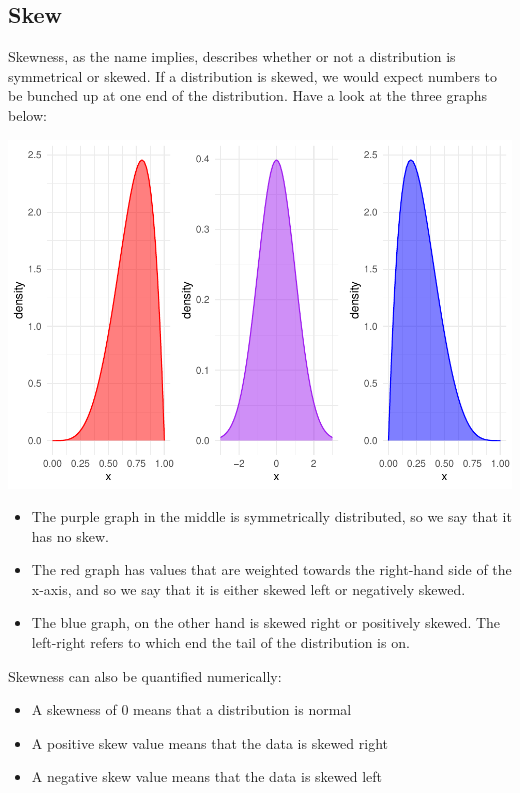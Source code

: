 \documentclass[
]{book}
\providecommand{\tightlist}{%
  \setlength{\itemsep}{0pt}\setlength{\parskip}{0pt}}
\begin{document}
\hypertarget{skew}{%
\subsection{Skew}\label{skew}}

Skewness, as the name implies, describes whether or not a distribution is symmetrical or skewed. If a distribution is skewed, we would expect numbers to be bunched up at one end of the distribution. Have a look at the three graphs below:

\begin{center}\includegraphics{_main_files/figure-latex/unnamed-chunk-70-1} \end{center}

\begin{itemize}
\tightlist
\item
  The purple graph in the middle is symmetrically distributed, so we say that it has no skew.
\item
  The red graph has values that are weighted towards the right-hand side of the x-axis, and so we say that it is either skewed left or negatively skewed.
\item
  The blue graph, on the other hand is skewed right or positively skewed. The left-right refers to which end the tail of the distribution is on.
\end{itemize}

Skewness can also be quantified numerically:

\begin{itemize}
\tightlist
\item
  A skewness of 0 means that a distribution is normal
\item
  A positive skew value means that the data is skewed right
\item
  A negative skew value means that the data is skewed left
\end{itemize}
\end{document}
